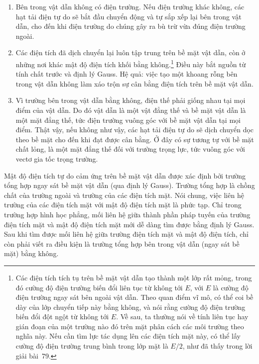\begin{enumerate}
\item Bên trong vật dẫn không có điện trường. Nếu điện trường khác không, các hạt tải điện tự do sẽ bắt đầu chuyển động và tự sắp xếp lại bên trong vật dẫn, cho đến khi điện trường do chúng gây ra bù trừ vừa đúng điện trường ngoài.
\item Các điện tích đã dịch chuyển lại luôn tập trung trên bề mặt vật dẫn, còn ở những nơi khác mật độ điện tích khối bằng không.\footnote{Các điện tích tích tụ trên bề mặt vật dẫn tạo thành một lớp rất mỏng, trong đó cường độ điện trường biến đổi liên tục từ không tới $E$, với $E$ là cường độ điện trường ngay sát bên ngoài vật dẫn. Theo quan điểm vĩ mô, có thể coi bề dày của lớp chuyển tiếp này bằng không, và nói rằng cường độ điện trường biến đổi đột ngột từ không tới $E$. Về sau, ta thường nói về tính liên tục hay gián đoạn của một trường nào đó trên mặt phân cách các môi trường theo nghĩa này. Nếu cần tìm lực tác dụng lên các điện tích mặt này, có thể lấy cường độ điện trường trung bình trong lớp mặt là $E/2$, như đã thấy trong lời giải bài~79.} Điều này bắt nguồn từ tính chất trước và định lý Gauss. Hệ quả: việc tạo một khoang rỗng bên trong vật dẫn không làm xáo trộn sự cân bằng điện tích trên bề mặt vật dẫn.
\item Vì trường bên trong vật dẫn bằng không, điện thế phải giống nhau tại mọi điểm của vật dẫn. Do đó vật dẫn là một vật đẳng thế và bề mặt vật dẫn là một mặt đẳng thế, tức điện trường vuông góc với bề mặt vật dẫn tại mọi điểm. Thật vậy, nếu không như vậy, các hạt tải điện tự do sẽ dịch chuyển dọc theo bề mặt cho đến khi đạt được cân bằng. Ở đây có sự tương tự với bề mặt chất lỏng, là một mặt đẳng thế đối với trường trọng lực, tức vuông góc với vectơ gia tốc trọng trường.
\end{enumerate}

Mật độ điện tích tự do cảm ứng trên bề mặt vật dẫn được xác định bởi trường tổng hợp ngay sát bề mặt vật dẫn (qua định lý Gauss). Trường tổng hợp là chồng chất của trường ngoài và trường của các điện tích mặt. Nói chung, việc liên hệ trường của các điện tích mặt với mật độ điện tích mặt là phức tạp. Chỉ trong trường hợp hình học phẳng, mối liên hệ giữa thành phần pháp tuyến của trường điện tích mặt và mật độ điện tích mặt mới dễ dàng tìm được bằng định lý Gauss. Sau khi tìm được mối liên hệ giữa trường điện tích mặt và mật độ điện tích, chỉ còn phải viết ra điều kiện là trường tổng hợp bên trong vật dẫn (ngay sát bề mặt) bằng không.

